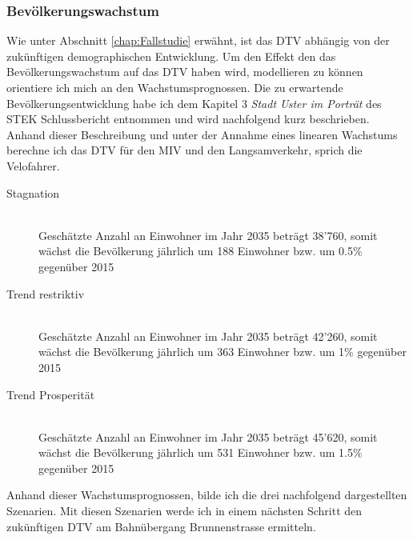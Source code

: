 %
%
%
%


\subsubsection*{Bevölkerungswachstum}
\label{subsubsec:Bevölkerung}

Wie unter Abschnitt \ref{chap:Fallstudie} erwähnt, ist das DTV abhängig von der zukünftigen demographischen Entwicklung.
Um den Effekt den das Bevölkerungswachstum auf das DTV haben wird, modellieren zu können orientiere ich mich an den Wachstumsprognossen.
Die zu erwartende Bevölkerungsentwicklung habe ich dem Kapitel 3 \textit{Stadt Uster im Porträt} des STEK Schlussbericht entnommen und wird nachfolgend kurz beschrieben. Anhand dieser Beschreibung und unter der Annahme eines linearen Wachstums berechne ich das DTV für den MIV und den Langsamverkehr, sprich die Velofahrer.


\begin{description}
\item[Stagnation] \hfill \\
Geschätzte Anzahl an Einwohner im Jahr 2035 beträgt 38'760, somit wächst die Bevölkerung jährlich um 188 Einwohner bzw. um 0.5\% gegenüber 2015
\item[Trend restriktiv] \hfill \\
Geschätzte Anzahl an Einwohner im Jahr 2035 beträgt 42'260, somit wächst die Bevölkerung jährlich um 363 Einwohner bzw. um 1\% gegenüber 2015
\item[Trend Prosperität] \hfill \\
Geschätzte Anzahl an Einwohner im Jahr 2035 beträgt 45'620, somit wächst die Bevölkerung jährlich um 531 Einwohner bzw. um 1.5\% gegenüber 2015
\end{description}

Anhand dieser Wachstumsprognossen, bilde ich die drei nachfolgend dargestellten Szenarien. Mit diesen Szenarien werde ich in einem nächsten Schritt den zukünftigen DTV am Bahnübergang Brunnenstrasse ermitteln.

